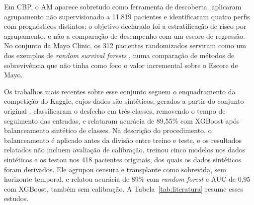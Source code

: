 Em CBP, o AM aparece sobretudo como ferramenta de descoberta.  aplicaram agrupamento não supervisionado a 11.819 pacientes e identificaram quatro perfis com prognósticos distintos; o objetivo declarado foi a estratificação de risco por agrupamento, e não a comparação de desempenho com um escore de regressão. No conjunto da Mayo Clinic, os 312 pacientes randomizados serviram como um dos exemplos de \textit{random survival forests} \cite{ishwaran2008rsf}, numa comparação de métodos de sobrevivência que não tinha como foco o valor incremental sobre o Escore de Mayo.

Os trabalhos mais recentes sobre esse conjunto seguem o enquadramento da competição do Kaggle, cujos dados são sintéticos, gerados a partir do conjunto original \cite{reade2023ps3e26}.  classificaram o desfecho em três classes, removendo o tempo de seguimento das entradas, e relataram acurácia de 89,55\% com XGBoost após balanceamento sintético de classes. Na descrição do procedimento, o balanceamento é aplicado antes da divisão entre treino e teste, e os resultados relatados não incluem avaliação de calibração.  treinou cinco modelos nos dados sintéticos e os testou nos 418 pacientes originais, dos quais os dados sintéticos foram derivados. Ele agrupou censura e transplante como sobrevida, sem horizonte temporal, e relatou acurácia de 89\% com \textit{random forest} e AUC de 0,95 com XGBoost, também sem calibração. A Tabela~\ref{tab:literatura} resume esses estudos.

